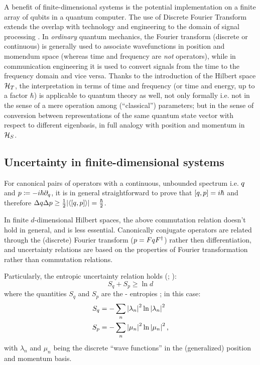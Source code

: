 A benefit of finite-dimensional systems is the potential implementation on a finite array of
qubits in a quantum computer. The use of Discrete Fourier Transform extends the overlap
with technology and engineering to the domain of signal processing \parencite{FiniteHilb}.
In \emph{ordinary} quantum mechanics, the Fourier transform (discrete or continuous)
is generally used
to associate wavefunctions in position and momendum space
(whereas time and frequency are \emph{not} operators),
while in communication engineering it is used to convert signals
from the time to the frequency domain and vice versa.
Thanks to the introduction of the Hilbert space $\mathcal{H}_T$,
the interpretation in terms of time and frequency
(or time and energy, up to a factor $\hbar$)
is applicable to quantum theory as well, not only formally
i.e. not in the sense of a mere operation among (``classical'') parameters;
but in the sense of conversion between representations of the
same quantum state vector with respect to different eigenbasis,
in full analogy with position and momentum in $\mathcal{H}_S$.

\subsection{Uncertainty in finite-dimensional systems}\label{sec:finite_uncertainty}
\citereset
For canonical pairs of operators with a continuous, unbounded spectrum i.e.
${q}$ and ${p} \coloneqq -i\hbar{\partial}_{q}$,
it is in general straightforward to prove that
$\qty[{q}, {p}] = i\hbar$ and therefore
$\Delta q \Delta p \geq {\frac{1}{2} \qty|\ev{\qty[\op{q}, \op{p}]}| = \frac{\hbar}{2}}$.

In finite $d$-dimensional Hilbert spaces, the above commutation relation doesn't hold
in general, and is less essential.
Canonically conjugate operators are related
through the (discrete) Fourier transform (${p} = F{q}F^{\dagger}$)
rather then differentiation,
and uncertainty relations are based on
the properties of Fourier transformation
rather than commutation relations.

Particularly, the entropic uncertainty relation holds
(\cite[]{FiniteHilb}; \cite{Deutsch:Uncertainty}):
\begin{equation}
  S_q + S_p \geq \ln d
\end{equation}
where the quantities $S_q$ and $S_p$ are the - entropies
\parencite[.A]{Wehner:Uncertainty}; in this case:
\begin{align}
  S_q &= -\sum_n \qty|\lambda_n |^2  \ln\qty|\lambda_n|^2 \\
  S_p &= -\sum_n \qty|\mu_n     |^2  \ln\qty|\mu_n    |^2
  \,\text{,}
\end{align}
with $\lambda_n$ and $\mu_n$ being the discrete ``wave functions'' in the
(generalized) position and momentum basis.

